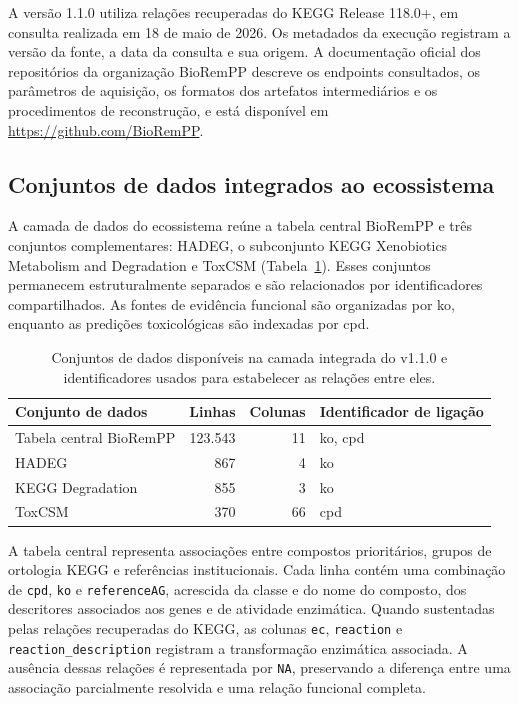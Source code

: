 A versão 1.1.0 utiliza relações recuperadas do KEGG Release 118.0+, em consulta
realizada em 18 de maio de 2026. Os metadados da execução registram a versão da
fonte, a data da consulta e sua origem. A documentação oficial dos repositórios
da organização BioRemPP descreve os endpoints consultados, os parâmetros de
aquisição, os formatos dos artefatos intermediários e os procedimentos de
reconstrução, e está disponível em
\url{https://github.com/BioRemPP}.

\subsection{Conjuntos de dados integrados ao ecossistema}

A camada de dados do ecossistema reúne a tabela central BioRemPP e três conjuntos complementares: HADEG, o subconjunto KEGG Xenobiotics Metabolism and Degradation e ToxCSM (Tabela~\ref{tab:c1-fontes}). Esses conjuntos permanecem estruturalmente separados e são relacionados por identificadores compartilhados. As fontes de evidência funcional são organizadas por \gls{ko}, enquanto as predições toxicológicas são indexadas por \gls{cpd}.

\begin{table}[htbp]
\centering
\caption{Conjuntos de dados disponíveis na camada integrada do \biorempp{} v1.1.0 e identificadores usados para estabelecer as relações entre eles.}
\label{tab:c1-fontes}
\small
\begin{tabular}{@{}lrrl@{}}
\toprule
\textbf{Conjunto de dados} & \textbf{Linhas} & \textbf{Colunas} & \textbf{Identificador de ligação} \\
\midrule
Tabela central BioRemPP & 123.543 & 11 & \gls{ko}, \gls{cpd} \\
HADEG                   &     867 &  4 & \gls{ko} \\
KEGG Degradation        &     855 &  3 & \gls{ko} \\
ToxCSM                  &     370 & 66 & \gls{cpd} \\
\bottomrule
\end{tabular}
\end{table}

A tabela central representa associações entre compostos prioritários, grupos de ortologia KEGG e referências institucionais. Cada linha contém uma combinação de \texttt{cpd}, \texttt{ko} e \texttt{referenceAG}, acrescida da classe e do nome do composto, dos descritores associados aos genes e de atividade enzimática. Quando sustentadas pelas relações recuperadas do KEGG, as colunas \texttt{ec}, \texttt{reaction} e \texttt{reaction\_description} registram a transformação enzimática associada. A ausência dessas relações é representada por \texttt{NA}, preservando a diferença entre uma associação parcialmente resolvida e uma relação funcional completa.

